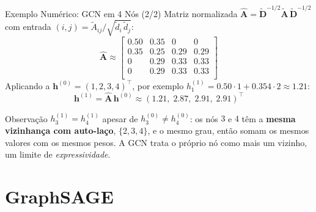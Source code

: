 \documentclass[aspectratio=169,xcolor=dvipsnames]{beamer}
\begin{document}
  \begin{frame}{Exemplo Numérico: GCN em 4 Nós (2/2)}
    Matriz normalizada $\hat{\mathbf{A}} = \tilde{\mathbf{D}}^{-1/2} \tilde{\mathbf{A}}\, \tilde{\mathbf{D}}^{-1/2}$
    com entrada $(i,j) = \tilde A_{ij}/\sqrt{\tilde d_i\, \tilde d_j}$:
    \[
      \hat{\mathbf{A}} \approx
      \begin{bmatrix}
        0.50 & 0.35 & 0      & 0      \\
        0.35 & 0.25 & 0.29 & 0.29 \\
        0      & 0.29 & 0.33 & 0.33 \\
        0      & 0.29 & 0.33 & 0.33 \\
      \end{bmatrix}
    \]
    Aplicando a $\mathbf{h}^{(0)} = (1, 2, 3, 4)^\top$, por exemplo
    $h^{(1)}_1 = 0.50 \cdot 1 + 0.354 \cdot 2 \approx 1.21$:
    \[
      \mathbf{h}^{(1)} = \hat{\mathbf{A}}\, \mathbf{h}^{(0)} \approx (1.21,\; 2.87,\; 2.91,\; 2.91)^\top
    \]
    \begin{alertblock}{Observação}
      $h^{(1)}_3 = h^{(1)}_4$ apesar de $h^{(0)}_3 \neq h^{(0)}_4$: os nós $3$
      e $4$ têm a \textbf{mesma vizinhança com auto-laço}, $\{2,3,4\}$, e o
      mesmo grau, então somam os mesmos valores com os mesmos pesos. A GCN
      trata o próprio nó como mais um vizinho, um limite de
      \textit{expressividade}.
    \end{alertblock}
  \end{frame}

  \section{GraphSAGE}
\end{document}
